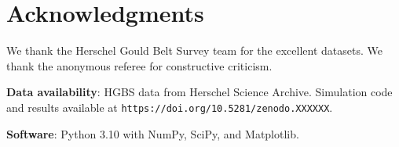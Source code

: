 \documentclass[11pt,a4paper]{article}
\begin{document}
\section*{Acknowledgments}

We thank the Herschel Gould Belt Survey team for the excellent datasets. We thank the anonymous referee for constructive criticism.

\textbf{Data availability}: HGBS data from Herschel Science Archive. Simulation code and results available at \texttt{https://doi.org/10.5281/zenodo.XXXXXX}.

\textbf{Software}: Python 3.10 with NumPy, SciPy, and Matplotlib.



\end{document}
